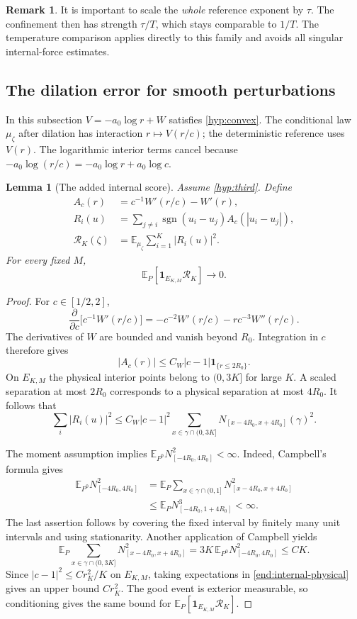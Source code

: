 \documentclass[11pt,reqno]{amsart}
\numberwithin{equation}{section}
\newtheorem{lemma}[theorem]{Lemma}
\theoremstyle{definition}
\newtheorem{remark}[theorem]{Remark}
\newcommand{\E}{\mathbb E}
\newcommand{\1}{\mathbf 1}
\DeclareMathOperator{\sgn}{sgn}
\begin{document}
\begin{remark}
It is important to scale the \emph{whole} reference exponent by
$\tau$. The confinement then has strength $\tau/T$, which stays
comparable to $1/T$. The temperature comparison applies directly to
this family and avoids all singular internal-force estimates.
\end{remark}

\subsection{The dilation error for smooth perturbations}
In this subsection $V=-a_0\log r+W$ satisfies
\eqref{hyp:convex}. The conditional law $\mu_\zeta$ after dilation has
interaction $r\mapsto V(r/c)$; the deterministic reference uses $V(r)$.
The logarithmic interior terms cancel because
$-a_0\log(r/c)=-a_0\log r+a_0\log c$.

\begin{lemma}[The added internal score]\label{end:internal-W}
Assume \eqref{hyp:third}. Define
\begin{align*}
A_c(r)&=c^{-1}W'(r/c)-W'(r),\\
R_i(u)&=\sum_{j\ne i}\sgn(u_i-u_j)A_c(|u_i-u_j|),\\
\mathcal R_K(\zeta)&=\E_{\mu_\zeta}\sum_{i=1}^K|R_i(u)|^2.
\end{align*}
For every fixed $M$,
\[
\E_P[\1_{E_{K,M}}\mathcal R_K]\longrightarrow0.
\]
\end{lemma}

\begin{proof}
For $c\in[1/2,2]$,
\[
\frac{\partial}{\partial c}\bigl[c^{-1}W'(r/c)\bigr]
=-c^{-2}W'(r/c)-rc^{-3}W''(r/c).
\]
The derivatives of $W$ are bounded and vanish beyond $R_0$.
Integration in $c$ therefore gives
\[
|A_c(r)|\le C_W|c-1|\1_{\{r\le2R_0\}}.
\]
On $E_{K,M}$ the physical interior points belong to $(0,3K]$ for
large $K$. A scaled separation at most $2R_0$ corresponds to a
physical separation at most $4R_0$. It follows that
\begin{equation}\label{end:internal-physical}
\sum_i|R_i(u)|^2
\le C_W|c-1|^2
\sum_{x\in\gamma\cap(0,3K]}
N_{[x-4R_0,x+4R_0]}(\gamma)^2.
\end{equation}

The moment assumption implies
$\E_{P^0}N_{[-4R_0,4R_0]}^2<\infty$. Indeed, Campbell's formula gives
\[
\begin{split}
\E_{P^0}N_{[-4R_0,4R_0]}^2
&=\E_P\sum_{x\in\gamma\cap(0,1]}
N_{[x-4R_0,x+4R_0]}^2\\
&\le \E_PN_{[-4R_0,1+4R_0]}^3<\infty.
\end{split}
\]
The last assertion follows by covering the fixed interval by finitely
many unit intervals and using stationarity.
Another application of Campbell yields
\[
\E_P\sum_{x\in\gamma\cap(0,3K]}
N_{[x-4R_0,x+4R_0]}^2
=3K\,\E_{P^0}N_{[-4R_0,4R_0]}^2\le CK.
\]
Since $|c-1|^2\le Cr_K^2/K$ on $E_{K,M}$, taking expectations
in \eqref{end:internal-physical} gives an upper bound $Cr_K^2$.
The good event is exterior measurable, so conditioning gives the same
bound for $\E_P[\1_{E_{K,M}}\mathcal R_K]$.
\end{proof}
\end{document}
